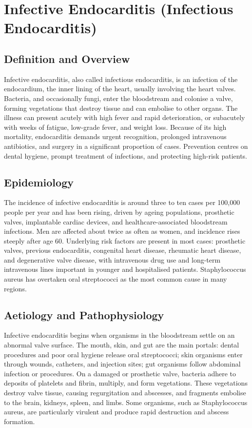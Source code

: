 \chapter{Infective Endocarditis (Infectious Endocarditis)}

\section*{Definition and Overview}
Infective endocarditis, also called infectious endocarditis, is an infection of the endocardium, the inner lining of the heart, usually involving the heart valves. Bacteria, and occasionally fungi, enter the bloodstream and colonise a valve, forming vegetations that destroy tissue and can embolise to other organs. The illness can present acutely with high fever and rapid deterioration, or subacutely with weeks of fatigue, low-grade fever, and weight loss. Because of its high mortality, endocarditis demands urgent recognition, prolonged intravenous antibiotics, and surgery in a significant proportion of cases. Prevention centres on dental hygiene, prompt treatment of infections, and protecting high-risk patients.

\section*{Epidemiology}
The incidence of infective endocarditis is around three to ten cases per 100,000 people per year and has been rising, driven by ageing populations, prosthetic valves, implantable cardiac devices, and healthcare-associated bloodstream infections. Men are affected about twice as often as women, and incidence rises steeply after age 60. Underlying risk factors are present in most cases: prosthetic valves, previous endocarditis, congenital heart disease, rheumatic heart disease, and degenerative valve disease, with intravenous drug use and long-term intravenous lines important in younger and hospitalised patients. Staphylococcus aureus has overtaken oral streptococci as the most common cause in many regions.

\section*{Aetiology and Pathophysiology}
Infective endocarditis begins when organisms in the bloodstream settle on an abnormal valve surface. The mouth, skin, and gut are the main portals: dental procedures and poor oral hygiene release oral streptococci; skin organisms enter through wounds, catheters, and injection sites; gut organisms follow abdominal infection or procedures. On a damaged or prosthetic valve, bacteria adhere to deposits of platelets and fibrin, multiply, and form vegetations. These vegetations destroy valve tissue, causing regurgitation and abscesses, and fragments embolise to the brain, kidneys, spleen, and limbs. Some organisms, such as Staphylococcus aureus, are particularly virulent and produce rapid destruction and abscess formation.

